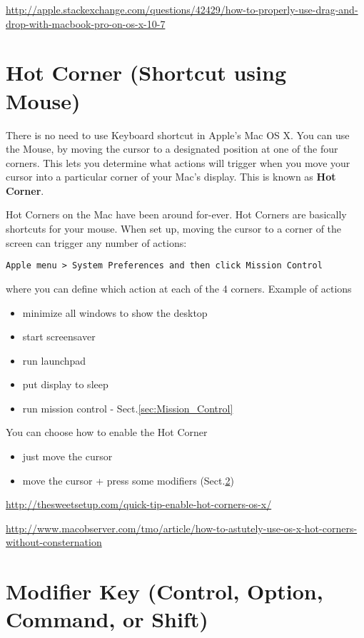 \url{http://apple.stackexchange.com/questions/42429/how-to-properly-use-drag-and-drop-with-macbook-pro-on-os-x-10-7}



\section{Hot Corner (Shortcut using Mouse)}
\label{sec:Hot_Corner}

There is no need to use Keyboard shortcut in Apple's Mac OS X.
You can use the Mouse, by moving the cursor to a designated position at one of
the four corners.
This lets you determine what actions will trigger when you move your cursor into
a particular corner of your Mac's display. This is known as {\bf Hot Corner}.

Hot Corners on the Mac have been around for-ever.
Hot Corners are basically shortcuts for your mouse. When set up, moving the
cursor to a corner of the screen can trigger any number of actions:
\begin{verbatim}
Apple menu > System Preferences and then click Mission Control
\end{verbatim}
where you can define which action at each of the 4 corners. Example of actions
\begin{itemize}
  \item minimize all windows to show the desktop
  \item start screensaver
  \item run launchpad
  \item put display to sleep
  \item run mission control - Sect.\ref{sec:Mission_Control}
\end{itemize}

You can choose how to enable the Hot Corner
\begin{itemize}
  \item just move the cursor 
  \item move the cursor + press some modifiers (Sect.\ref{sec:modifier_key})
\end{itemize}

\url{http://thesweetsetup.com/quick-tip-enable-hot-corners-os-x/}

\url{http://www.macobserver.com/tmo/article/how-to-astutely-use-os-x-hot-corners-without-consternation}

\section{Modifier Key (Control, Option, Command, or Shift)}
\label{sec:modifier_key}


